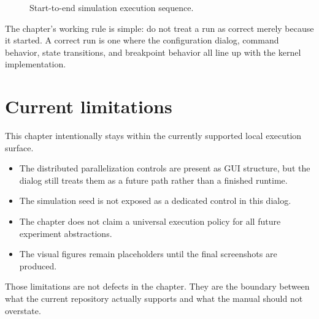 \begin{figure}[htbp]
\centering
\caption{Start-to-end simulation execution sequence.}
\label{fig:running-simulations-sequence}
\end{figure}

The chapter's working rule is simple: do not treat a run as correct merely
because it started. A correct run is one where the configuration dialog,
command behavior, state transitions, and breakpoint behavior all line up with
the kernel implementation.

\section{Current limitations}
\label{sec:running-simulations-limitations}

This chapter intentionally stays within the currently supported local execution
surface.
\begin{itemize}
\item The distributed parallelization controls are present as GUI structure, but
the dialog still treats them as a future path rather than a finished runtime.
\item The simulation seed is not exposed as a dedicated control in this dialog.
\item The chapter does not claim a universal execution policy for all future
experiment abstractions.
\item The visual figures remain placeholders until the final screenshots are
produced.
\end{itemize}

Those limitations are not defects in the chapter. They are the boundary between
what the current repository actually supports and what the manual should not
overstate.
